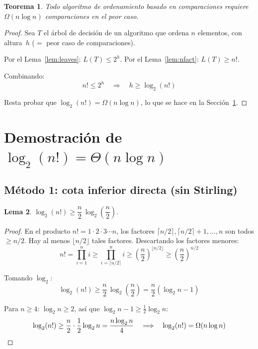 \documentclass[11pt, letterpaper]{article}
\theoremstyle{definition}
\theoremstyle{plain}
\newtheorem{theorem}{Teorema}[section]
\newtheorem{lemma}[theorem]{Lema}
\theoremstyle{remark}
\begin{document}
\begin{theorem}\label{thm:lower-bound}
Todo algoritmo de ordenamiento basado en comparaciones requiere
$\Omega(n \log n)$ comparaciones en el peor caso.
\end{theorem}

\begin{proof}
Sea $T$ el árbol de decisión de un algoritmo que ordena $n$ elementos,
con altura~$h$ ($=$ peor caso de comparaciones).

Por el Lema~\ref{lem:leaves}: $L(T) \leq 2^h$.
Por el Lema~\ref{lem:nfact}: $L(T) \geq n!$.

Combinando:
\[
  n! \leq 2^h
  \quad\Longrightarrow\quad
  h \geq \log_2(n!)
\]

Resta probar que $\log_2(n!) = \Omega(n \log n)$, lo que se hace en la
Sección~\ref{sec:logfact}.
\end{proof}

\section{Demostración de
  \texorpdfstring{$\log_2(n!) = \Theta(n \log n)$}{log2(n!) = Theta(n log n)}}
\label{sec:logfact}

\subsection{Método 1: cota inferior directa (sin Stirling)}

\begin{lemma}\label{lem:logfact-lower}
$\log_2(n!) \geq \dfrac{n}{2}\,\log_2\!\left(\dfrac{n}{2}\right)$.
\end{lemma}

\begin{proof}
En el producto $n! = 1 \cdot 2 \cdot 3 \cdots n$, los factores
$\lceil n/2 \rceil, \lceil n/2 \rceil + 1, \ldots, n$ son todos
$\geq n/2$. Hay al menos $\lfloor n/2 \rfloor$ tales factores.
Descartando los factores menores:
\[
  n! = \prod_{i=1}^{n} i
  \geq \prod_{i=\lceil n/2 \rceil}^{n} i
  \geq \left(\frac{n}{2}\right)^{\!\lfloor n/2 \rfloor}
  \geq \left(\frac{n}{2}\right)^{\!n/2}
\]

Tomando $\log_2$:
\[
  \log_2(n!) \geq \frac{n}{2}\,\log_2\!\left(\frac{n}{2}\right)
  = \frac{n}{2}(\log_2 n - 1)
\]

Para $n \geq 4$: $\log_2 n \geq 2$, así que
$\log_2 n - 1 \geq \frac{1}{2}\log_2 n$:
\[
  \log_2(n!) \geq \frac{n}{2} \cdot \frac{1}{2}\log_2 n
  = \frac{n \log_2 n}{4}
  \quad\Longrightarrow\quad
  \log_2(n!) = \Omega(n \log n) \qedhere
\]
\end{proof}
\end{document}
